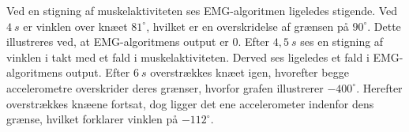 Ved en stigning af muskelaktiviteten ses EMG-algoritmen ligeledes stigende. Ved $4~s$ er vinklen over knæet $81^{\circ}$, hvilket er en overskridelse af grænsen på $90^{\circ}$. Dette illustreres ved, at EMG-algoritmens output er 0. 
Efter $4,5~s$ ses en stigning af vinklen i takt med et fald i muskelaktiviteten. Derved ses ligeledes et fald i EMG-algoritmens output. 
Efter $6~s$ overstrækkes knæet igen, hvorefter begge accelerometre overskrider deres grænser, hvorfor grafen illustrerer $-400^{\circ}$. Herefter overstrækkes knæene fortsat, dog ligger det ene accelerometer indenfor dens grænse, hvilket forklarer vinklen på $-112^{\circ}$. 
